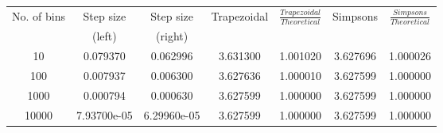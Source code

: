 \begin{center}
\begin{longtable}{|c|c|c|c|c|c|c|}
\hline
No. of bins & Step size & Step size & Trapezoidal & $\frac{Trapezoidal}{Theoretical}$ & Simpsons & $\frac{Simpsons}{Theoretical}$ \\
 & (left) & (right) & & & & \\ 
\hline
\hline
10 & 0.079370 & 0.062996 & 3.631300 & 1.001020 & 3.627696 & 1.000026 \\
\hline
100 & 0.007937 & 0.006300 & 3.627636 & 1.000010 & \cellcolor{codegreen}3.627599 & 1.000000 \\
\hline
1000 & 0.000794 & 0.000630 & \cellcolor{codegreen}3.627599 & 1.000000 & \cellcolor{codegreen}3.627599 & 1.000000 \\
\hline
10000 & 7.93700e-05 & 6.29960e-05 & \cellcolor{codegreen}3.627599 & 1.000000 & \cellcolor{codegreen}3.627599 & 1.000000 \\
\hline
\hline
\end{longtable}
\end{center}
